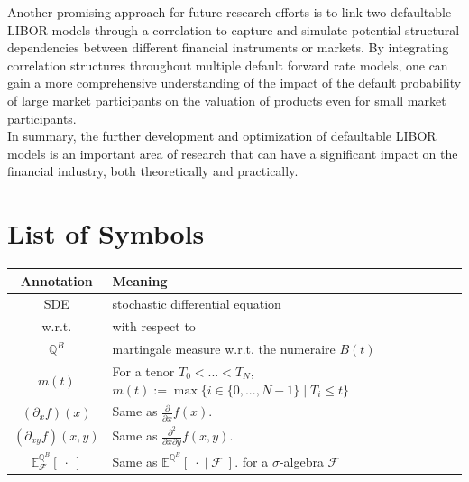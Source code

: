 \documentclass[12pt]{article}
\begin{document}
	Another promising approach for future research efforts is to link two defaultable LIBOR models through a correlation to capture and simulate potential structural dependencies between different financial instruments or markets.
	By integrating correlation structures throughout multiple default forward rate models, one can gain a more comprehensive understanding of the impact of the default probability of large market participants on the valuation of products even for small market participants.\\
	In summary, the further development and optimization of defaultable LIBOR models is an important area of research that can have a significant impact on the financial industry, both theoretically and practically.
	
	
	
	\pagebreak
	\section{List of Symbols}
	\begin{tabular}{cl}
		
		Annotation & Meaning \\
		\hline
		SDE & stochastic differential equation \\
		w.r.t. & with respect to \\
		$\mathbb{Q}^B$ & martingale measure w.r.t. the numeraire $B(t)$\\
		$m(t)$ & For a tenor $T_0 < ... < T_N$, $m(t):= \max\{i \in \{0, ..., N-1\} \; | \; T_i \le t \}$\\
		$(\partial_{x}f)(x)$ & Same as $\frac{\partial}{\partial x}f(x)$.\\
		$(\partial_{x y}f)(x, y)$ & Same as $\frac{\partial^2}{\partial x \partial y}f(x, y)$.\\
		$\mathbb{E}^{\mathbb{Q}^B}_{\mathcal{F}}\left[ \; \cdot \; \right]$ & Same as
		$\mathbb{E}^{\mathbb{Q}^B}\left[ \; \cdot \; | \; \mathcal{F} \; \right].$ for a $\sigma$-algebra $\mathcal{F}$\\
		
	\end{tabular}
	\pagebreak
		
		
		
		
		
\end{document}
